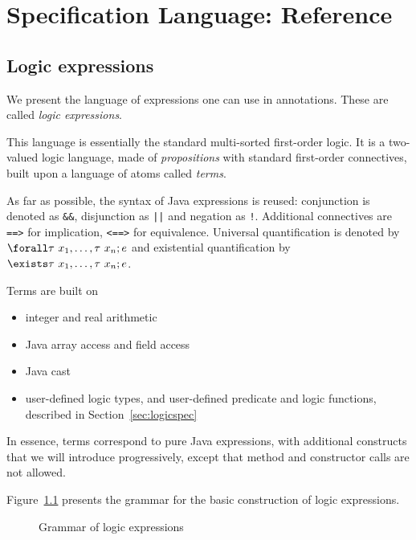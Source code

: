 \documentclass[a4paper,11pt,twoside,openright]{report}
\begin{document}


\chapter{Specification Language: Reference}
\label{chap:reference} 

\section{Logic expressions}
\label{sec:expressions}

We present the language of expressions one can use in
annotations. These are called \emph{logic expressions}. 

This language is essentially the standard multi-sorted first-order
logic. It is a two-valued logic language, made of \emph{propositions}
with standard first-order connectives, built upon a language
of atoms called \emph{terms}. 

As far as possible, the syntax of Java expressions is reused:
conjunction is denoted as \verb|&&|, disjunction as \verb+||+ and
negation as \verb|!|.  Additional connectives are \verb|==>| for
implication, \verb|<==>| for equivalence. Universal quantification is
denoted by $\bskw{forall} \tau~x_1,\ldots,\tau~x_n; e$ and existential
quantification by $\bskw{exists} \tau~x_1,\ldots,\tau~x_n; e$.

Terms are built on 
\begin{itemize}
\item integer and real arithmetic
\item Java array access and field access
\item Java cast
\item user-defined logic types, and user-defined predicate and logic
  functions, described in Section~\ref{sec:logicspec}
\end{itemize}
In essence, terms correspond to pure Java expressions, with additional
constructs that we will introduce progressively, except that method
and constructor calls are not allowed.

Figure~\ref{fig:gram:lexpr} presents the grammar for the basic
construction of logic expressions.  

\begin{figure}[p]
  \caption{Grammar of logic expressions}
\label{fig:gram:lexpr}
\end{figure}
\end{document}
